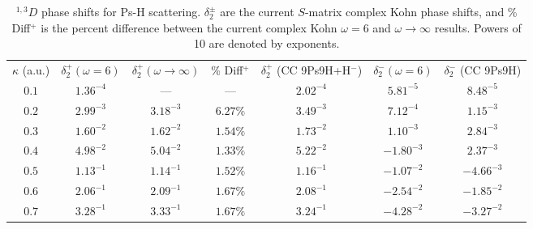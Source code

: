\documentclass[preprint,showpacs,showkeys,preprintnumbers,amsmath,amssymb,longbibliography,pra,aps]{revtex4-1}
\begin{document}
{\begin{table}
\begin{center}
\begin{ruledtabular}
\begin{tabular}{c | c c c c | c c}
$\kappa$ (a.u.) & $\delta_2^+ (\omega = 6)$ & $\delta_2^+ (\omega \rightarrow \infty)$ & \% Diff$^+$ & $\delta_2^+$ (CC 9Ps9H+H$^-$) \cite{Walters2004} & $\delta_2^- (\omega = 6)$ & $\delta_2^-$ (CC 9Ps9H) \cite{Blackwood2002} \\
\colrule
$0.1$ & $1.36^{-4}$ & --- & --- & $2.02^{-4}$ & $5.81^{-5}$ & $8.48^{-5}$ \\
$0.2$ & $2.99^{-3}$ & $3.18^{-3}$ & $6.27\%$ & $3.49^{-3}$ & $7.12^{-4}$ & $1.15^{-3}$ \\
$0.3$ & $1.60^{-2}$ & $1.62^{-2}$ & $1.54\%$ & $1.73^{-2}$ & $1.10^{-3}$ & $2.84^{-3}$ \\
$0.4$ & $4.98^{-2}$ & $5.04^{-2}$ & $1.33\%$ & $5.22^{-2}$ & $-1.80^{-3}$ & $2.37^{-3}$ \\
$0.5$ & $1.13^{-1}$ & $1.14^{-1}$ & $1.52\%$ & $1.16^{-1}$ & $-1.07^{-2}$ & $-4.66^{-3}$ \\
$0.6$ & $2.06^{-1}$ & $2.09^{-1}$ & $1.67\%$ & $2.08^{-1}$ & $-2.54^{-2}$ & $-1.85^{-2}$ \\
$0.7$ & $3.28^{-1}$ & $3.33^{-1}$ & $1.67\%$ & $3.24^{-1}$ & $-4.28^{-2}$ & $-3.27^{-2}$ \\
\end{tabular}
\end{ruledtabular}
\caption{$^{1,3}D$ phase shifts for Ps-H scattering. $\delta_2^\pm$ are the current
$S$-matrix complex Kohn phase shifts, and \% Diff$^+$ is the percent difference
between the current complex Kohn $\omega = 6$ and $\omega \rightarrow \infty$
results. Powers of 10 are denoted by exponents.}
\label{tab:DWavePhase}
\end{center}
\end{table}



}
\end{document}
